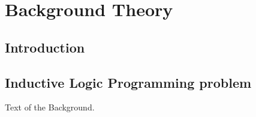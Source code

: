 
\chapter{Background Theory}

\label{ch:background}

\section{Introduction}

\section{Inductive Logic Programming problem}

Text of the Background.
